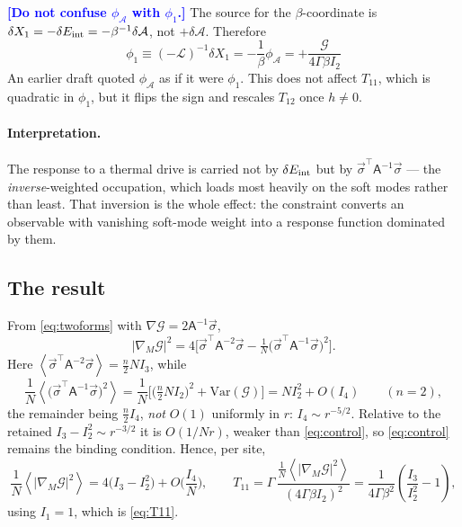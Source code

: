 \documentclass[11pt,a4paper]{article}
\newcommand{\avg}[1]{\left\langle #1 \right\rangle}
\newcommand{\FLAG}[1]{\textcolor{blue}{\textbf{[#1]}}}
\newcommand{\Ac}{\mathcal{A}}
\newcommand{\Gc}{\mathcal{G}}
\newcommand{\Lc}{\mathcal{L}}
\newcommand{\Tm}{T}
\newcommand{\bs}{\vec\sigma}
\newcommand{\avg}[1]{\left\langle #1 \right\rangle}
\newcommand{\FLAG}[1]{\textcolor{blue}{\textbf{[#1]}}}
\begin{document}
\FLAG{Do not confuse $\phi_{\Ac}$ with $\phi_1$.} The source for the $\beta$-coordinate is
$\delta X_1=-\delta E_{\rm int}=-\beta^{-1}\delta\Ac$, not $+\delta\Ac$. Therefore
\begin{equation}
  \boxed{\ \phi_1\equiv(-\Lc)^{-1}\delta X_1=-\frac1\beta\phi_{\Ac}
   =+\frac{\Gc}{4\Gamma\beta I_2}\ }
  \label{eq:phi1}
\end{equation}
An earlier draft quoted $\phi_{\Ac}$ as if it were $\phi_1$. This does not affect
$\Tm_{11}$, which is quadratic in $\phi_1$, but it flips the sign and rescales
$\Tm_{12}$ once $h\neq0$.

\paragraph{Interpretation.} The response to a thermal drive is carried not by
$\delta E_{\rm int}$ but by $\bs^\top\mathsf A^{-1}\bs$ --- the \emph{inverse}-weighted
occupation, which loads most heavily on the soft modes rather than least. That inversion is
the whole effect: the constraint converts an observable with vanishing soft-mode weight into
a response function dominated by them.

\subsection{The result}
From \eqref{eq:twoforms} with $\nabla\Gc=2\mathsf A^{-1}\bs$,
\begin{equation}
  |\nabla_M\Gc|^2=4\Big[\bs^\top\mathsf A^{-2}\bs-\tfrac1N\big(\bs^\top\mathsf A^{-1}\bs\big)^2\Big].
\end{equation}
Here $\avg{\bs^\top\mathsf A^{-2}\bs}=\tfrac n2NI_3$, while
\begin{equation}
  \frac1N\avg{\big(\bs^\top\mathsf A^{-1}\bs\big)^2}
   =\frac1N\Big[\big(\tfrac n2NI_2\big)^2+\mathrm{Var}(\Gc)\Big]
   =NI_2^2+O(I_4)\qquad(n=2),
\end{equation}
the remainder being $\tfrac n2 I_4$, \emph{not} $O(1)$ uniformly in $r$: $I_4\sim r^{-5/2}$.
Relative to the retained $I_3-I_2^2\sim r^{-3/2}$ it is $O(1/Nr)$, weaker than
\eqref{eq:control}, so \eqref{eq:control} remains the binding condition. Hence, per site,
\begin{equation}
  \frac1N\avg{|\nabla_M\Gc|^2}=4\big(I_3-I_2^2\big)+O\!\Big(\frac{I_4}{N}\Big),
  \qquad
  \Tm_{11}=\Gamma\,\frac{\tfrac1N\avg{|\nabla_M\Gc|^2}}{(4\Gamma\beta I_2)^2}
  =\frac{1}{4\Gamma\beta^{2}}\left(\frac{I_3}{I_2^{2}}-1\right),
\end{equation}
using $I_1=1$, which is \eqref{eq:T11}.
\end{document}

